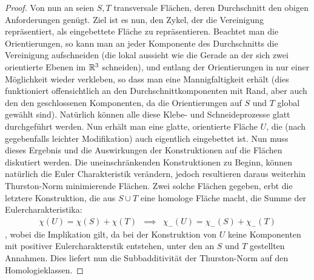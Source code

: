 \begin{proof}
            Von nun an seien $S,T$ transversale Flächen, deren Durchschnitt den obigen Anforderungen genügt. Ziel ist es nun, den Zykel, der die Vereinigung repräsentiert, als eingebettete Fläche zu repräsentieren. Beachtet man die Orientierungen, so kann man an jeder Komponente des Durchschnitts die Vereinigung aufschneiden (die lokal aussieht wie die Gerade an der sich zwei orientierte Ebenen im $\mathbb{R}^3$ schneiden), und entlang der Orientierungen in nur einer Möglichkeit wieder verkleben, so dass man eine Mannigfaltigkeit erhält (dies funktioniert offensichtlich an den Durchschnittkomponenten mit Rand, aber auch den den geschlossenen Komponenten, da die Orientierungen auf $S$ und $T$ global gewählt sind). Natürlich können alle diese Klebe- und Schneideprozesse glatt durchgeführt werden. Nun erhält man eine glatte, orientierte Fläche $U$, die (nach gegebenfalls leichter Modifikation) auch eigentlich eingebettet ist. Nun muss dieses Ergebnis und die Auswirkungen der Konstruktionen auf die Flächen diskutiert werden. Die uneinschränkenden Konstruktionen zu Beginn, können natürlich die Euler Charakteristik verändern, jedoch resultieren daraus weiterhin Thurston-Norm minimierende Flächen. Zwei solche Flächen gegeben, erbt die letztere Konstruktion, die aus $S\cup T$ eine homologe Fläche macht, die Summe der Eulercharakteristika:
            \begin{eqnarray*}
                \chi(U) = \chi(S) + \chi(T) &\implies& \chi_-(U)=\chi_-(S) + \chi_-(T)
            \end{eqnarray*}
            , wobei die Implikation gilt, da bei der Konstruktion von $U$ keine Komponenten mit positiver Eulercharakterstik entstehen, unter den an $S$ und $T$ gestellten Annahmen. Dies liefert nun die Subbadditivität der Thurston-Norm auf den Homologieklassen.
        \end{proof}

